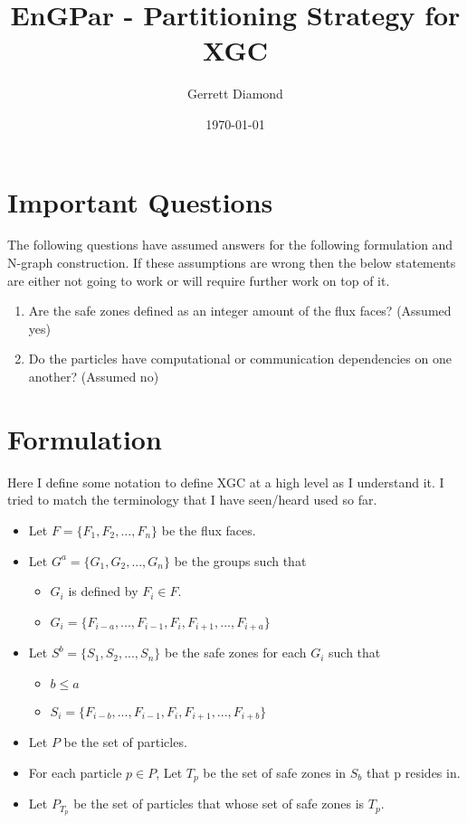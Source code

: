 \documentclass[a4paper]{article}
\title{EnGPar - Partitioning Strategy for XGC}
\author{Gerrett Diamond}
\date{\today}
\begin{document}
\maketitle

\section{Important Questions}
The following questions have assumed answers for the following formulation
and N-graph construction. If these assumptions are wrong then the below
statements are either not going to work or will require further work on
top of it.
\begin{enumerate}
\item Are the safe zones defined as an integer amount of the flux faces? (Assumed yes)
\item Do the particles have computational or communication dependencies on one another? (Assumed no)
\end{enumerate}

\section{Formulation}
Here I define some notation to define XGC at a high level as I understand it. I tried to match the terminology that I have seen/heard used so far. \\

\begin{itemize}
\item Let $F = \{F_1,F_2, ..., F_n\}$ be the flux faces.
\item Let $G^a = \{G_1, G_2, ..., G_n\}$ be the groups such that
  \begin{itemize}
  \item $G_i$ is defined by $F_i\in F$.
  \item $G_i = \{F_{i-a},...,F_{i-1},F_i,F_{i+1},...,F_{i+a}\}$ 
  \end{itemize}
\item Let $S^b = \{S_1,S_2,...,S_n\}$ be the safe zones for each $G_i$ such that
  \begin{itemize}
  \item $b \le a$
  \item $S_i = \{F_{i-b},...,F_{i-1},F_i,F_{i+1},...,F_{i+b}\}$ 
  \end{itemize}
\item Let $P$ be the set of particles.
\item For each particle $p\in P$, Let $T_p$ be the set of safe zones in $S_b$ that p resides in.
\item {\color{blue} Let $P_{T_p}$ be the set of particles that whose set of safe zones is $T_p$.}
\end{itemize}
\end{document}
